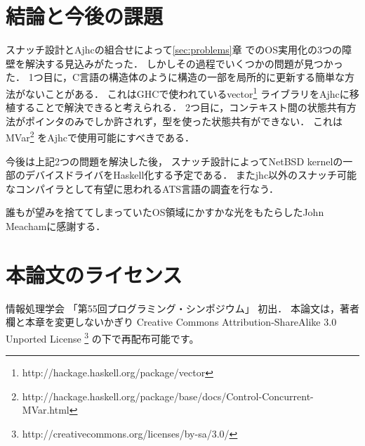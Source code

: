 \documentclass[submit,techreq,noauthor]{ipsj}
\begin{document}
\section{結論と今後の課題}

スナッチ設計とAjhcの組合せによって\ref{sec:problems}章
でのOS実用化の3つの障壁を解決する見込みがたった．
しかしその過程でいくつかの問題が見つかった．
1つ目に，C言語の構造体のように構造の一部を局所的に更新する簡単な方法がないことがある．
これはGHCで使われているvector\footnote{http://hackage.haskell.org/package/vector}
ライブラリをAjhcに移植することで解決できると考えられる．
2つ目に，コンテキスト間の状態共有方法がポインタのみでしか許されず，型を使った状態共有ができない．
これはMVar\footnote{http://hackage.haskell.org/package/base/docs/Control-Concurrent-MVar.html}
をAjhcで使用可能にすべきである．

今後は上記2つの問題を解決した後，
スナッチ設計によってNetBSD kernelの一部のデバイスドライバをHaskell化する予定である．
またjhc以外のスナッチ可能なコンパイラとして有望に思われるATS言語\cite{ats}の調査を行なう．

\begin{acknowledgment}
誰もが望みを捨ててしまっていたOS領域にかすかな光をもたらしたJohn Meachamに感謝する．
\end{acknowledgment}

\section{本論文のライセンス}

情報処理学会 「第55回プログラミング・シンポジウム」 初出．
本論文は，著者欄と本章を変更しないかぎり
Creative Commons Attribution-ShareAlike 3.0 Unported License \footnote{http://creativecommons.org/licenses/by-sa/3.0/} の下で再配布可能です。



\end{document}
